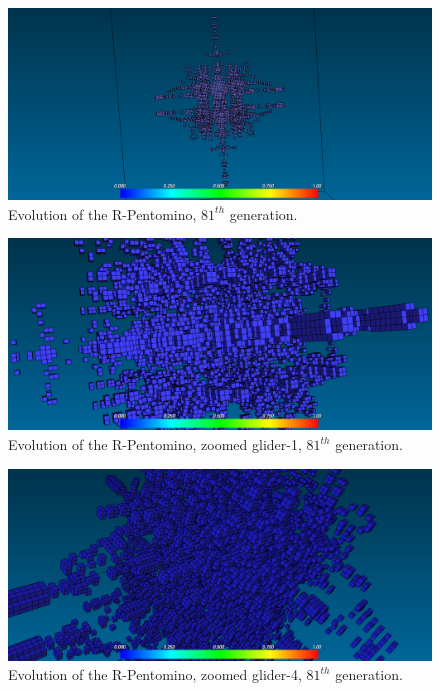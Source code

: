 \begin{figure}
	\centering
	\includegraphics[scale=0.3]{pentominoes_ss/r_81.png}
	\caption{Evolution of the R-Pentomino, $81^{th}$ generation.}
  \label{fig:ss-pent:r-81}
\end{figure}

\begin{figure}
	\centering
	\includegraphics[scale=0.3]{pentominoes_ss/r_81_glider1.png}
	\caption{Evolution of the R-Pentomino, zoomed glider-1, $81^{th}$ generation.}
  \label{fig:ss-pent:r-81-glider1}
\end{figure}

\begin{figure}
	\centering
	\includegraphics[scale=0.3]{pentominoes_ss/r_81_glider4.png}
	\caption{Evolution of the R-Pentomino, zoomed glider-4, $81^{th}$ generation.}
  \label{fig:ss-pent:r-81-glider4}
\end{figure}


